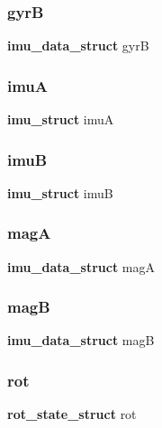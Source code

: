 \subsubsection{gyrB}
{\footnotesize\ttfamily \textbf{ imu\+\_\+data\+\_\+struct} gyrB}

\mbox{\label{imu_8h_a80c3fa2dac67c8961550f0785c52bd0d}} 
\subsubsection{imuA}
{\footnotesize\ttfamily \textbf{ imu\+\_\+struct} imuA}

\mbox{\label{imu_8h_aa8ca6675849a90580c0178656ec8940d}} 
\subsubsection{imuB}
{\footnotesize\ttfamily \textbf{ imu\+\_\+struct} imuB}

\mbox{\label{imu_8h_ad30fb62eae143c114711e32633fb71e4}} 
\subsubsection{magA}
{\footnotesize\ttfamily \textbf{ imu\+\_\+data\+\_\+struct} magA}

\mbox{\label{imu_8h_addb86f4e5447b90230832279b54e5f6b}} 
\subsubsection{magB}
{\footnotesize\ttfamily \textbf{ imu\+\_\+data\+\_\+struct} magB}

\mbox{\label{imu_8h_aec8031d973dc90f01b4d73f2beb92efe}} 
\subsubsection{rot}
{\footnotesize\ttfamily \textbf{ rot\+\_\+state\+\_\+struct} rot}


